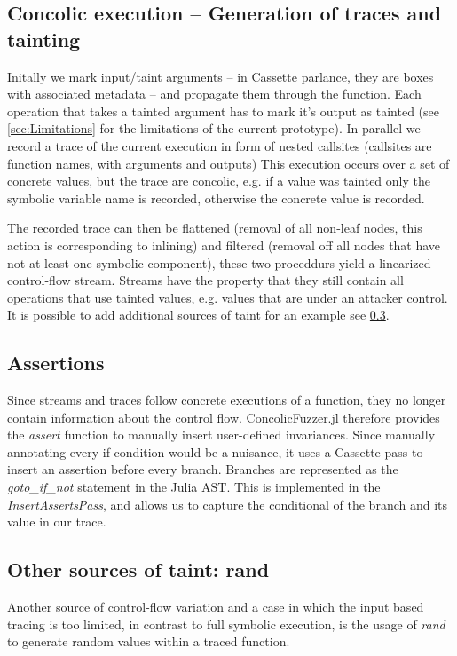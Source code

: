 \documentclass{article} %
\begin{document}
\subsection{Concolic execution -- Generation of traces and tainting}
Initally we mark input/taint arguments -- in Cassette parlance, they are boxes with associated metadata -- and
propagate them through the function. Each operation that takes a tainted argument has to mark it's output as
tainted (see \cref{sec:Limitations} for the limitations of the current prototype). In parallel we record a
trace of the current execution in form of nested callsites (callsites are function names, with arguments and outputs)
This execution occurs over a set of concrete values, but the trace are concolic, e.g. if a value was tainted only
the symbolic variable name is recorded, otherwise the concrete value is recorded.

The recorded trace can then be flattened (removal of all non-leaf nodes, this action is corresponding to inlining)
and filtered (removal off all nodes that have not at least one symbolic component), these two proceddurs yield
a linearized control-flow stream. Streams have the property that they still contain all operations that use tainted
values, e.g. values that are under an attacker control. It is possible to add additional sources of taint for an
example see \cref{subsec:rand}.

\subsection{Assertions}
Since streams and traces follow concrete executions of a function, they no longer contain information about the
control flow. ConcolicFuzzer.jl therefore provides the \emph{assert} function to manually insert user-defined
invariances. Since manually annotating every if-condition would be a nuisance, it uses a Cassette pass to
insert an assertion before every branch. Branches are represented as the \emph{goto\_if\_not} statement in the Julia AST.
This is implemented in the \emph{InsertAssertsPass}, and allows us to capture the conditional of the branch and
its value in our trace.

\subsection{Other sources of taint: rand}
\label{subsec:rand}
Another source of control-flow variation and a case in which the input based tracing is too limited, in contrast
to full symbolic execution, is the usage of \emph{rand} to generate random values within a traced function.
\end{document}
